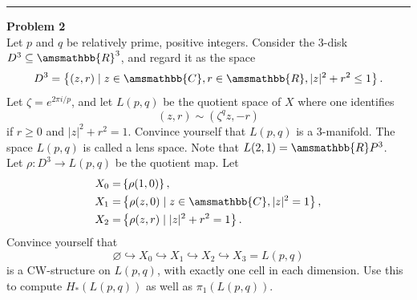 \documentclass[letterpaper, 12pt]{article}
\newenvironment{problem}[2][Problem]
		{ \begin{mdframed}[backgroundcolor=gray!20] \textbf{#1 #2} \\}
		{  \end{mdframed}}
\renewcommand{\mathbb}{\amsmathbb}
\begin{document}
\noindent\rule{7in}{2.8pt}
\begin{problem}{2}
Let \(p\) and \(q\) be relatively prime, positive integers. Consider the \(3\)-disk \(D^3\subseteq \mathbb{R}^3\), and regard it as the space 
\[D^3=\left\{ (z,r)\mid z\in \mathbb{C}, r\in \mathbb{R}, |z|^2+r^2\leq 1\right\}.\]
Let  \(\zeta=e^{2\pi i/p}\), and let \(L(p,q)\) be the quotient space of \(X\) where one identifies 
\[(z,r)\sim (\zeta^qz,-r)\]
if \(r\geq 0\) and \(|z|^2+r^2=1\). Convince yourself that \(L(p,q)\) is a 3-manifold. The space \(L(p,q)\) is called a lens space. Note that \(L(2,1)=\mathbb{R}P^3\). \\ 
Let \(\rho:D^3\rightarrow L(p,q)\) be the quotient map. Let 
\begin{align*}
    X_0=&\left\{ \rho(1,0) \right\},\\ 
    X_1=&\left\{ \rho(z,0)\mid z\in \mathbb{C},|z|^2=1 \right\},\\ 
    X_2=&\left\{ \rho(z,r)\mid |z|^2+r^2=1 \right\}.
\end{align*}
Convince yourself that 
\[\varnothing \hookrightarrow X_0\hookrightarrow X_1\hookrightarrow X_2\hookrightarrow X_3=L(p,q)\]
 is a CW-structure on \(L(p,q)\), with exactly one cell in each dimension. Use this to compute \(H_*(L(p,q))\) as well as \(\pi_1(L(p,q))\).
\end{problem}
\end{document}

